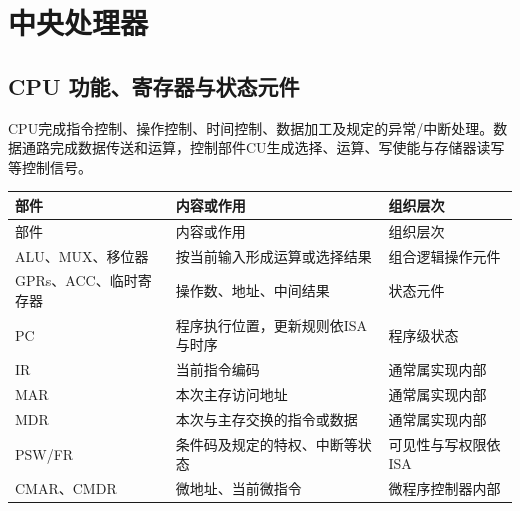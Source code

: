 \chapter{中央处理器}\label{CO05}

\section{CPU 功能、寄存器与状态元件}\label{CO05-state}

CPU完成指令控制、操作控制、时间控制、数据加工及规定的异常/中断处理。数据通路完成数据传送和运算，控制部件CU生成选择、运算、写使能与存储器读写等控制信号。

\par\smallskip
{\fontsize{9.3}{12}\selectfont\setlength{\tabcolsep}{2.5pt}\setlength{\LTleft}{0pt}\setlength{\LTright}{0pt}
\begin{longtable}{@{}>{\raggedright\arraybackslash}p{}>{\raggedright\arraybackslash}p{}>{\raggedright\arraybackslash}p{}@{}}
\toprule
部件 & 内容或作用 & 组织层次 \\

\midrule\endfirsthead\toprule
部件 & 内容或作用 & 组织层次 \\

\midrule\endhead\bottomrule\endfoot
ALU、MUX、移位器 & 按当前输入形成运算或选择结果 & 组合逻辑操作元件 \\

GPRs、ACC、临时寄存器 & 操作数、地址、中间结果 & 状态元件 \\

PC & 程序执行位置，更新规则依ISA与时序 & 程序级状态 \\

IR & 当前指令编码 & 通常属实现内部 \\

MAR & 本次主存访问地址 & 通常属实现内部 \\

MDR & 本次与主存交换的指令或数据 & 通常属实现内部 \\

PSW/FR & 条件码及规定的特权、中断等状态 & 可见性与写权限依ISA \\

CMAR、CMDR & 微地址、当前微指令 & 微程序控制器内部 \\

\end{longtable}}
\par\smallskip

